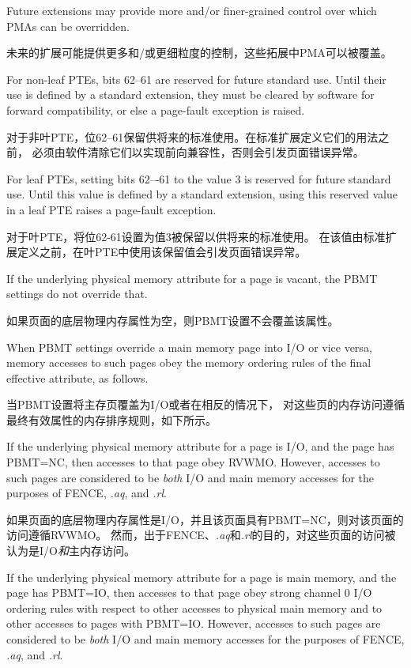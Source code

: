 \begin{commentary}
Future extensions may provide more and/or finer-grained control over which PMAs
can be overridden.

未来的扩展可能提供更多和/或更细粒度的控制，这些拓展中PMA可以被覆盖。
\end{commentary}

For non-leaf PTEs, bits 62--61 are reserved for future standard use.  Until
their use is defined by a standard extension, they must be cleared by software
for forward compatibility, or else a page-fault exception is raised.

对于非叶PTE，位62--61保留供将来的标准使用。在标准扩展定义它们的用法之前，
必须由软件清除它们以实现前向兼容性，否则会引发页面错误异常。

For leaf PTEs, setting bits 62–-61 to the value 3 is reserved for future
standard use.
Until this value is defined by a standard extension, using this reserved value
in a leaf PTE raises a page-fault exception.

对于叶PTE，将位62-61设置为值3被保留以供将来的标准使用。
在该值由标准扩展定义之前，在叶PTE中使用该保留值会引发页面错误异常。


If the underlying physical memory attribute for a page is vacant, the PBMT settings do not override that.

如果页面的底层物理内存属性为空，则PBMT设置不会覆盖该属性。

When PBMT settings override a main memory page into I/O or vice versa, memory
accesses to such pages obey the memory ordering rules of the final effective
attribute, as follows.

当PBMT设置将主存页覆盖为I/O或者在相反的情况下，
对这些页的内存访问遵循最终有效属性的内存排序规则，如下所示。

If the underlying physical memory attribute for a page is I/O, and the page has
PBMT=NC, then accesses to that page obey RVWMO.
However, accesses to such pages are
considered to be {\em both} I/O and main memory accesses for the purposes of FENCE,
{\em.aq}, and {\em.rl}.

如果页面的底层物理内存属性是I/O，并且该页面具有PBMT=NC，则对该页面的访问遵循RVWMO。
然而，出于FENCE、{\em.aq}和{\em.rl}的目的，对这些页面的访问被认为是I/O{\em 和}主内存访问。

If the underlying physical memory attribute for a page is main memory, and the
page has PBMT=IO, then accesses to that page obey strong channel 0 I/O ordering
rules with respect to other accesses to physical main memory and to other
accesses to pages with PBMT=IO.
However, accesses to such pages are
considered to be {\em both} I/O and main memory accesses for the purposes of FENCE,
{\em.aq}, and {\em.rl}.

